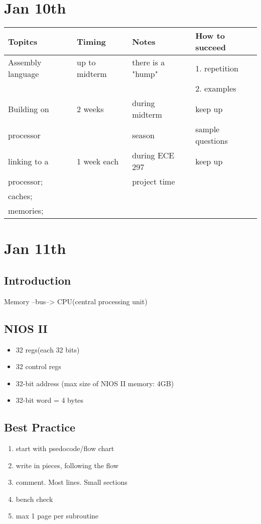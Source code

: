 \documentclass[11pt]{article}
\author{CharlieHu}
\date{\today}
\title{}
\begin{document}
\tableofcontents

\section{Jan 10th}
\label{sec:orgheadline1}
\begin{center}
\begin{tabular}{llll}
Topitcs & Timing & Notes & How to succeed\\
\hline
Assembly language & up to midterm & there is a "hump" & 1. repetition\\
 &  &  & 2. examples\\
\hline
Building on & 2 weeks & during midterm & keep up\\
processor &  & season & sample questions\\
\hline
linking to a & 1 week each & during ECE 297 & keep up\\
processor; &  & project time & \\
caches; &  &  & \\
memories; &  &  & \\
\end{tabular}
\end{center}

\section{Jan 11th}
\label{sec:orgheadline5}
\subsection{Introduction}
\label{sec:orgheadline2}
Memory --bus--> CPU(central processing unit)
\subsection{NIOS II}
\label{sec:orgheadline3}
\begin{itemize}
\item 32 regs(each 32 bits)
\item 32 control regs
\item 32-bit address (max size of NIOS II memory: 4GB)
\item 32-bit word = 4 bytes
\end{itemize}
\subsection{Best Practice}
\label{sec:orgheadline4}
\begin{enumerate}
\item start with psedocode/flow chart
\item write in pieces, following the flow
\item comment. Most lines. Small sections
\item bench check
\item max 1 page per subroutine
\end{enumerate}
\end{document}
